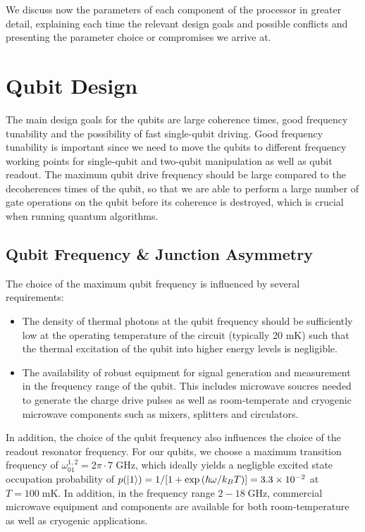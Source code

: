 \smallskip

We discuss now the parameters of each component of the processor in greater detail, explaining each time the relevant design goals and possible conflicts and presenting the parameter choice or compromises we arrive at.

\section{Qubit Design}

The main design goals for the qubits are large coherence times, good frequency tunability and the possibility of fast single-qubit driving. Good frequency tunability is important since we need to move the qubits to different frequency working points for single-qubit and two-qubit manipulation as well as qubit readout. The maximum qubit drive frequency should be large compared to the decoherences times of the qubit, so that we are able to perform a large number of gate operations on the qubit before its coherence is destroyed, which is crucial when running quantum algorithms.

\subsection{Qubit Frequency \& Junction Asymmetry}

The choice of the maximum qubit frequency is influenced by several requirements:

\begin{itemize}
\item The density of thermal photons at the qubit frequency should be sufficiently low at the operating temperature of the circuit (typically 20 mK) such that the thermal excitation of the qubit into higher energy levels is negligible.
\item The availability of robust equipment for signal generation and measurement in the frequency range of the qubit. This includes microwave soucres needed to generate the charge drive pulses as well as room-temperate and cryogenic microwave components such as mixers, splitters and circulators.
\end{itemize}

In addition, the choice of the qubit frequency also influences the choice of the readout resonator frequency. For our qubits, we choose a maximum transition frequency of $\omega_{01}^{1,2}= 2\pi \cdot 7 \;\mathrm{GHz}$, which ideally yields a negligble excited state occupation probability of $p(\left| 1 \right>)=1/[1+\exp{(\hbar \omega / k_B T)}]=3.3\times 10^{-2}$ at $T=100\;\mathrm{mK}$. In addition, in the frequency range $2-18\;\mathrm{GHz}$, commercial microwave equipment and components are available for both room-temperature as well as cryogenic applications.

